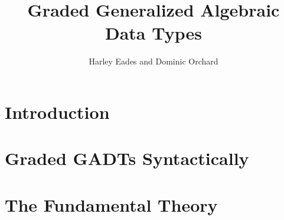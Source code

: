 \documentclass[12pt]{article}
\title{Graded Generalized Algebraic Data Types}
\author{Harley Eades and Dominic Orchard}
\begin{document}
\maketitle

\begin{abstract}
  
\end{abstract}

\tableofcontents

\section{Introduction}
\label{sec:introduction}


\section{Graded GADTs Syntactically}
\label{sec:Graded GADTs Syntactically}


\section{The Fundamental Theory} 
\label{sec:The Fundamental Theory}




\appendix
\end{document}
